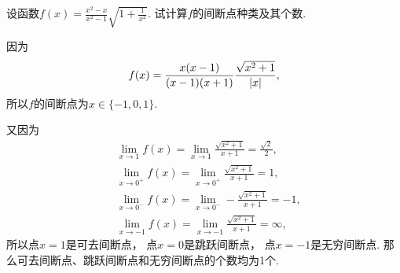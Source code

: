 \begin{example}
设函数\(f(x) = \frac{x^2-x}{x^2-1}\sqrt{1+\frac{1}{x^2}}\).
试计算\(f\)的间断点种类及其个数.
\begin{solution}
因为\[
	f(x) = \frac{x(x-1)}{(x-1)(x+1)} \frac{\sqrt{x^2+1}}{\abs{x}},
\]
所以\(f\)的间断点为\(x\in\{-1,0,1\}\).

又因为\begin{align*}
	&\lim_{x\to1} f(x)
	= \lim_{x\to1} \frac{\sqrt{x^2+1}}{x+1}
	= \frac{\sqrt{2}}{2}, \\
	&\lim_{x\to0^+} f(x)
	= \lim_{x\to0^+} \frac{\sqrt{x^2+1}}{x+1}
	= 1, \\
	&\lim_{x\to0^-} f(x)
	= \lim_{x\to0^-} -\frac{\sqrt{x^2+1}}{x+1}
	= -1, \\
	&\lim_{x\to-1} f(x)
	= \lim_{x\to-1} \frac{\sqrt{x^2+1}}{x+1}
	= \infty,
\end{align*}
所以点\(x=1\)是可去间断点，
点\(x=0\)是跳跃间断点，
点\(x=-1\)是无穷间断点.
那么可去间断点、跳跃间断点和无穷间断点的个数均为1个.
\end{solution}
\end{example}



